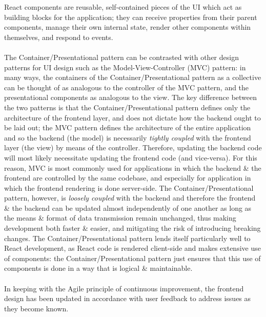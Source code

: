 \documentclass[a4paper,11pt]{report}
\begin{document}
React components are reusable, self-contained pieces of the UI which act as building blocks for the application\supercite{reactcomponents};
they can receive properties from their parent components, manage their own internal state, render other components within themselves, and respond to events.
\\\\
The Container/Presentational pattern can be contrasted with other design patterns for UI design such as the Model-View-Controller (MVC) pattern\supercite{reenskaug2003mvc}:
in many ways, the containers of the Container/Presentational pattern as a collective can be thought of as analogous to the controller of the MVC pattern, and the presentational components as analogous to the view.
The key difference between the two patterns is that the Container/Presentational pattern defines only the architecture of the frontend layer, and does not dictate how the backend ought to be laid out;
the MVC pattern defines the architecture of the entire application and so the backend (the model) is necessarily \textit{tightly coupled}\supercite{mcnatt2001coupling} with the frontend layer (the view) by means of the controller.
Therefore, updating the backend code will most likely necessitate updating the frontend code (and vice-versa).
For this reason, MVC is most commonly used for applications in which the backend \& the frontend are controlled by the same codebase, and especially for application in which the frontend rendering is done server-side.
The Container/Presentational pattern, however, is \textit{loosely coupled}\supercite{mcnatt2001coupling} with the backend and therefore the frontend \& the backend can be updated almost independently of one another as long as the means \& format of data transmission remain unchanged, thus making development both faster \& easier, and mitigating the risk of introducing breaking changes.
The Container/Presentational pattern lends itself particularly well to React development, as React code is rendered client-side and makes extensive use of components: the Container/Presentational pattern just ensures that this use of components is done in a way that is logical \& maintainable.
\\\\
In keeping with the Agile principle of continuous improvement\supercite{agilemanifesto}, the frontend design has been updated in accordance with user feedback to address issues as they become known. 
\end{document}

